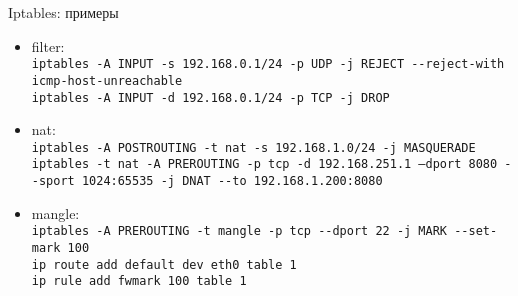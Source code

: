 \begin{frame}{Iptables: примеры}

	\small
	\begin{itemize}
		\item filter:\\
			{\tt iptables -A INPUT -s 192.168.0.1/24 -p UDP -j REJECT -{}-reject-with icmp-host-unreachable}\\
			{\tt iptables -A INPUT -d 192.168.0.1/24 -p TCP -j DROP}
		\item nat:\\
			{\tt iptables -A POSTROUTING -t nat -s 192.168.1.0/24 -j MASQUERADE}\\
			{\tt iptables -t nat -A PREROUTING -p tcp -d 192.168.251.1 
			--dport 8080 -{}-sport 1024:65535 -j DNAT -{}-to 192.168.1.200:8080}
		\item mangle:\\
			{\tt iptables -A PREROUTING -t mangle -p tcp -{}-dport 22 -j MARK -{}-set-mark 100}\\
			{\tt ip route add default dev eth0 table 1}\\
			{\tt ip rule add fwmark 100 table 1}
	\end{itemize}

\end{frame}



